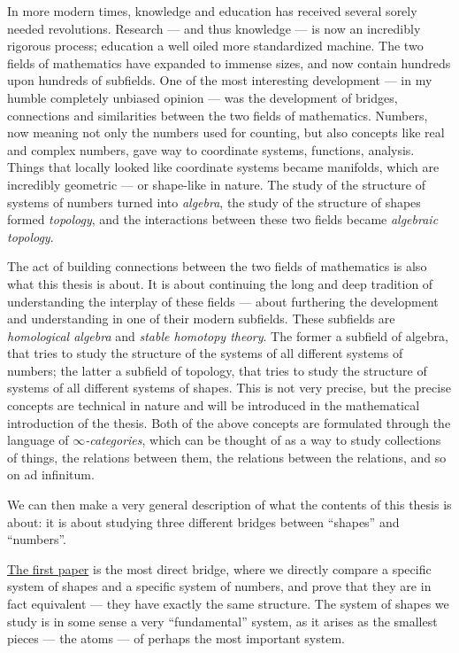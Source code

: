 In more modern times, knowledge and education has received several sorely needed revolutions. Research --- and thus knowledge --- is now an incredibly rigorous process; education a well oiled more standardized machine. The two fields of mathematics have expanded to immense sizes, and now contain hundreds upon hundreds of subfields. One of the most interesting development --- in my humble completely unbiased opinion --- was the development of bridges, connections and similarities between the two fields of mathematics. Numbers, now meaning not only the numbers used for counting, but also concepts like real and complex numbers, gave way to coordinate systems, functions, analysis. Things that locally looked like coordinate systems became manifolds, which are incredibly geometric --- or shape-like in nature. The study of the structure of systems of numbers turned into \emph{algebra}, the study of the structure of shapes formed \emph{topology}, and the interactions between these two fields became \emph{algebraic topology}. 

The act of building connections between the two fields of mathematics is also what this thesis is about. It is about continuing the long and deep tradition of understanding the interplay of these fields --- about furthering the development and understanding in one of their modern subfields. These subfields are \emph{homological algebra} and \emph{stable homotopy theory}. The former a subfield of algebra, that tries to study the structure of the systems of all different systems of numbers; the latter a subfield of topology, that tries to study the structure of systems of all different systems of shapes. This is not very precise, but the precise concepts are technical in nature and will be introduced in the mathematical introduction of the thesis. Both of the above concepts are formulated through the language of \emph{$\infty$-categories}, which can be thought of as a way to study collections of things, the relations between them, the relations between the relations, and so on ad infinitum. 

We can then make a very general description of what the contents of this thesis is about: it is about studying three different bridges between ``shapes'' and ``numbers''. 

{\hyperref[ch1]{The first paper}} is the most direct bridge, where we directly compare a specific system of shapes and a specific system of numbers, and prove that they are in fact equivalent --- they have exactly the same structure. The system of shapes we study is in some sense a very ``fundamental'' system, as it arises as the smallest pieces --- the atoms --- of perhaps the most important system. 

